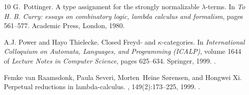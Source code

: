 \documentclass[10pt,a4paper]{amsart}
\begin{document}
\begin{thebibliography}{10}
G.~Pottinger.
\newblock A type assignment for the strongly normalizable $\lambda$-terms.
\newblock In {\em To H. B. Curry: essays on combinatory logic, lambda calculus
  and formalism}, pages 561--577. Academic Press, London, 1980.

A.J. Power and Hayo Thielecke.
\newblock Closed {F}reyd- and $\kappa$-categories.
\newblock In {\em International Colloquium on Automata, Languages, and
  Programming (ICALP)}, volume 1644 of {\em Lecture Notes in Computer Science},
  pages 625--634. Springer, 1999.
\newblock \href {https://doi.org/10.1007/3-540-48523-6_59}
  {}.

Femke van Raamsdonk, Paula Severi, Morten~Heine S{\o}rensen, and Hongwei Xi.
\newblock Perpetual reductions in lambda-calculus.
, 149(2):173--225, 1999.
\newblock \href {https://doi.org/10.1006/inco.1998.2750}
  {}.

\end{thebibliography}
\end{document}
